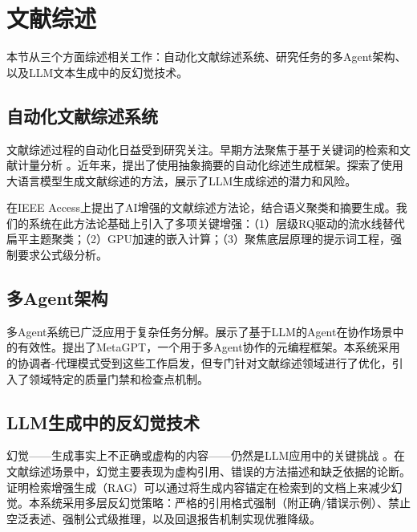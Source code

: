\section{文献综述}
\label{sec:lit-rev}

本节从三个方面综述相关工作：自动化文献综述系统、研究任务的多Agent架构、以及LLM文本生成中的反幻觉技术。

\subsection{自动化文献综述系统}

文献综述过程的自动化日益受到研究关注。早期方法聚焦于基于关键词的检索和文献计量分析 \citep{white-mccain-1998}。近年来，\citet{wang-etal-2020}提出了使用抽象摘要的自动化综述生成框架。\citet{alaofi-etal-2023}探索了使用大语言模型生成文献综述的方法，展示了LLM生成综述的潜力和风险。

\citet{kostousov-2025}在IEEE Access上提出了AI增强的文献综述方法论，结合语义聚类和摘要生成。我们的系统在此方法论基础上引入了多项关键增强：（1）层级RQ驱动的流水线替代扁平主题聚类；（2）GPU加速的嵌入计算；（3）聚焦底层原理的提示词工程，强制要求公式级分析。

\subsection{多Agent架构}

多Agent系统已广泛应用于复杂任务分解。\citet{park-etal-2023}展示了基于LLM的Agent在协作场景中的有效性。\citet{hong-etal-2024}提出了MetaGPT，一个用于多Agent协作的元编程框架。本系统采用的协调者-代理模式受到这些工作启发，但专门针对文献综述领域进行了优化，引入了领域特定的质量门禁和检查点机制。

\subsection{LLM生成中的反幻觉技术}

幻觉——生成事实上不正确或虚构的内容——仍然是LLM应用中的关键挑战 \citep{ji-etal-2023}。在文献综述场景中，幻觉主要表现为虚构引用、错误的方法描述和缺乏依据的论断。\citet{shuster-etal-2021}证明检索增强生成（RAG）可以通过将生成内容锚定在检索到的文档上来减少幻觉。本系统采用多层反幻觉策略：严格的引用格式强制（附正确/错误示例）、禁止空泛表述、强制公式级推理，以及回退报告机制实现优雅降级。
